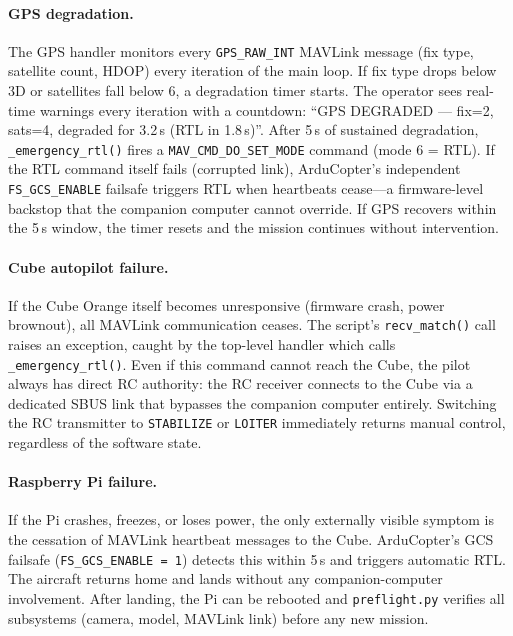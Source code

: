 \paragraph{GPS degradation.}
The GPS handler monitors every \texttt{GPS\_RAW\_INT} MAVLink message (fix type, satellite count, HDOP) every iteration of the main loop.  If fix type drops below 3D or satellites fall below 6, a degradation timer starts.  The operator sees real-time warnings every iteration with a countdown: ``GPS DEGRADED --- fix=2, sats=4, degraded for 3.2\,s (RTL in 1.8\,s)''.  After 5\,s of sustained degradation, \texttt{\_emergency\_rtl()} fires a \texttt{MAV\_CMD\_DO\_SET\_MODE} command (mode 6 = RTL).  If the RTL command itself fails (corrupted link), ArduCopter's independent \texttt{FS\_GCS\_ENABLE} failsafe triggers RTL when heartbeats cease---a firmware-level backstop that the companion computer cannot override.  If GPS recovers within the 5\,s window, the timer resets and the mission continues without intervention.

\paragraph{Cube autopilot failure.}
If the Cube Orange itself becomes unresponsive (firmware crash, power brownout), all MAVLink communication ceases.  The script's \texttt{recv\_match()} call raises an exception, caught by the top-level handler which calls \texttt{\_emergency\_rtl()}.  Even if this command cannot reach the Cube, the pilot always has direct RC authority: the RC receiver connects to the Cube via a dedicated SBUS link that bypasses the companion computer entirely.  Switching the RC transmitter to \texttt{STABILIZE} or \texttt{LOITER} immediately returns manual control, regardless of the software state.

\paragraph{Raspberry Pi failure.}
If the Pi crashes, freezes, or loses power, the only externally visible symptom is the cessation of MAVLink heartbeat messages to the Cube.  ArduCopter's GCS failsafe (\texttt{FS\_GCS\_ENABLE = 1}) detects this within 5\,s and triggers automatic RTL.  The aircraft returns home and lands without any companion-computer involvement.  After landing, the Pi can be rebooted and \texttt{preflight.py} verifies all subsystems (camera, model, MAVLink link) before any new mission.

